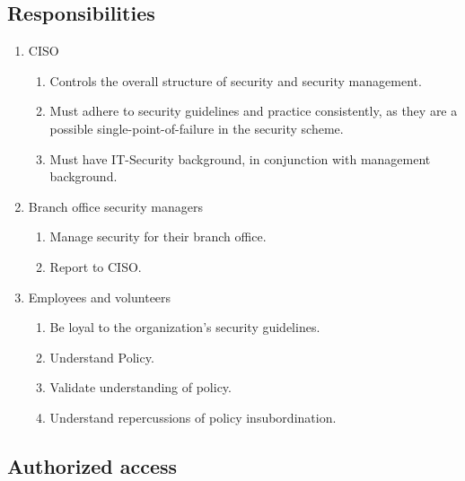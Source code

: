 \subsection{Responsibilities}

\begin{enumerate}
  \item CISO 
  \begin{enumerate}
    \item Controls the overall structure of security and security management.
    \item Must adhere to security guidelines and practice consistently, as they are a possible single-point-of-failure in the security scheme.
    \item Must have IT-Security background, in conjunction with management background.
  \end{enumerate}
  \item Branch office security managers
  \begin{enumerate}
     \item Manage security for their branch office.
     \item Report to CISO.
  \end{enumerate}
  \item Employees and volunteers
  \begin{enumerate}
    \item Be loyal to the organization's security guidelines.
    \item Understand Policy.
    \item Validate understanding of policy.
    \item Understand repercussions of policy insubordination.
  \end{enumerate}
\end{enumerate}

\subsection{Authorized access}

